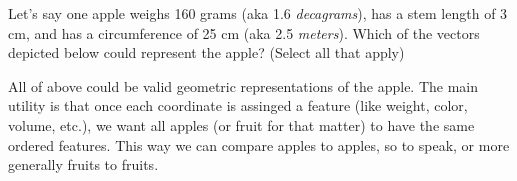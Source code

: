 \documentclass{ximera}
\begin{document}
\begin{exploration}

  Let's say one apple weighs 160 grams (aka 1.6 \emph{decagrams}), has a stem length of 3 cm, and has a circumference of 25 cm (aka 2.5 \emph{meters}). Which of the vectors depicted below could represent the apple? (Select all that apply)

  


\begin{solution}

  All of above could be valid geometric representations of the apple. The main utility is that once each coordinate is assinged a feature (like weight, color, volume, etc.), we want all apples (or fruit for that matter) to have the same ordered features. This way we can compare apples to apples, so to speak, or more generally fruits to fruits.

\end{solution}

\end{exploration}
\end{document}

